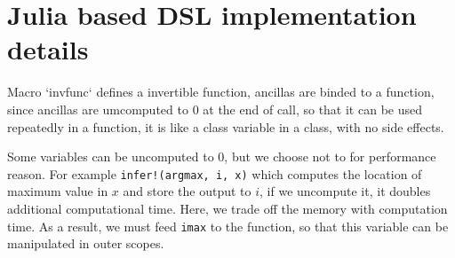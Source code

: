 \documentclass[aps,twocolumn,longbibliography,english,superscriptaddress,prr]{revtex4-1}
\newcommand{\<}{\langle}
\renewcommand{\>}{\rangle}
\begin{document}
\section{Julia based DSL implementation details}

Macro `invfunc` defines a invertible function, ancillas are binded to a function, since ancillas are umcomputed to $0$ at the end of call, so that it can be used repeatedly in a function, it is like a class variable in a class, with no side effects.

Some variables can be uncomputed to $0$, but we choose not to for performance reason. For example
\texttt{infer!(argmax, i, x)} which computes the location of maximum value in $x$ and store the output to $i$, if we uncompute it, it doubles additional computational time. Here, we trade off the memory with computation time. As a result, we must feed \texttt{imax} to the function, so that this variable can be manipulated in outer scopes.
\end{document}
